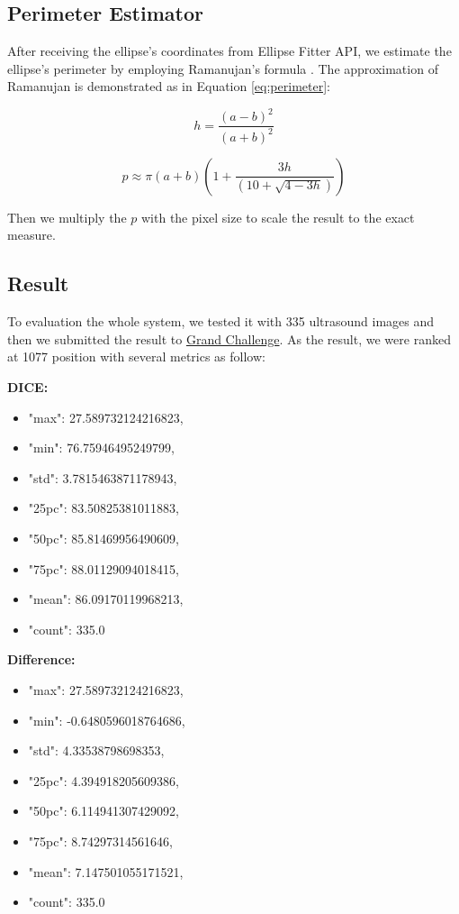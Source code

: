 \subsection{Perimeter Estimator}
\noindent
	
	After receiving the ellipse's coordinates from Ellipse Fitter API, we estimate the ellipse's perimeter by employing Ramanujan’s formula \cite{perimeter}. The approximation of Ramanujan is demonstrated as in Equation \eqref{eq:perimeter}:
	
	\[ h = \frac{(a-b)^2}{(a+b)^2} \]
	
	\[ p \approx \pi (a+b) (1 + \frac{3h}{(10 + \sqrt{4 - 3h})} ) \label{eq:perimeter} \]

\noindent
	Then we multiply the $p$ with the pixel size to scale the result to the exact measure.
	
\subsection{Result}
\noindent

	To evaluation the whole system, we tested it with 335 ultrasound images and then we submitted the result to  \href{https://hc18.grand-challenge.org/}{Grand Challenge}. As the result, we were ranked at 1077 position with several metrics as follow:
	
	\textbf{DICE:}
	\begin{itemize}
		\item "max": 27.589732124216823,
		\item "min": 76.75946495249799,
		\item "std": 3.7815463871178943,
		\item "25pc": 83.50825381011883,
		\item "50pc": 85.81469956490609,
		\item "75pc": 88.01129094018415,
		\item "mean": 86.09170119968213,
		\item "count": 335.0
	\end{itemize}

	\textbf{Difference:}
	\begin{itemize}
		\item "max": 27.589732124216823,
		\item "min": -0.6480596018764686,
		\item "std": 4.33538798698353,
		\item "25pc": 4.394918205609386,
		\item "50pc": 6.114941307429092,
		\item "75pc": 8.74297314561646,
		\item "mean": 7.147501055171521,
		\item "count": 335.0
	\end{itemize}
	
